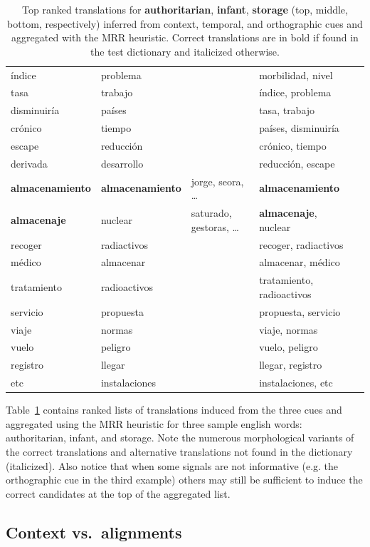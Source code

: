 \documentclass{article}
\newcommand{\tabref}[1]{Table~\ref{#1}}
\begin{document}
\begin{table}[h!]
\begin{center}
\begin{tabular}{lllll}
índice	&	problema	&	&	morbilidad, nivel\\
tasa	&	trabajo	&	&	índice, problema\\
disminuiría	&	países	&	&	tasa, trabajo\\
cr\'{o}nico	&	tiempo	&	&	países, disminuiría\\
escape	&	reducci\'{o}n	&	&	 cr\'{o}nico, tiempo\\
derivada	&	desarrollo	&	&	reducci\'{o}n, escape\\
\hline
{\bf almacenamiento}	&	{\bf almacenamiento}	&	jorge, seora, \dots	&	{\bf almacenamiento}\\
{\bf almacenaje}	&	nuclear	&	saturado, gestoras, \dots	&	{\bf almacenaje}, nuclear\\
recoger	&	radiactivos	&	&	recoger, radiactivos\\
m\'{e}dico	&	almacenar	&	&	almacenar, m\'{e}dico\\
tratamiento	&	radioactivos	&	&	tratamiento, radioactivos\\
servicio	&	propuesta	&	&	propuesta, servicio\\
viaje	&	normas	&	&	viaje, normas\\
vuelo	&	peligro	&	&	vuelo, peligro\\
registro	&	llegar	&	&	llegar, registro\\
etc	&	instalaciones	&	&	instalaciones, etc\\
\end{tabular}
\end{center}
\normalsize
\caption{Top ranked translations for {\bf authoritarian}, {\bf infant}, {\bf storage} (top, middle, bottom, respectively) inferred from context, temporal, and orthographic cues and aggregated with the MRR heuristic.  Correct translations are in bold if found in the test dictionary and italicized otherwise.}
\label{fig:examplelists}
\end{table}

\tabref{fig:examplelists} contains ranked lists of translations induced from the three cues and aggregated using the MRR heuristic for three sample english words: authoritarian, infant, and storage.  Note the numerous morphological variants of the correct translations and alternative translations not found in the dictionary (italicized).  Also notice that when some signals are not informative (e.g. the orthographic cue in the third example) others may still be sufficient to induce the correct candidates at the top of the aggregated list.

\subsection{Context vs.\ alignments} 
\end{document}
